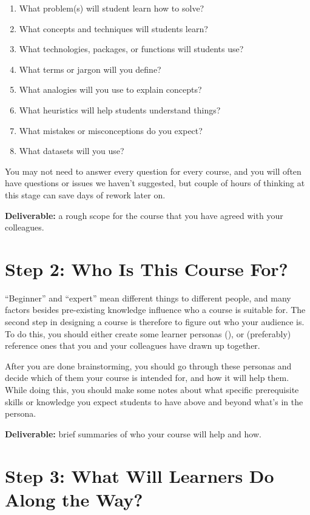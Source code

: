 \begin{enumerate}
\item
  What problem(s) will student learn how to solve?
\item
  What concepts and techniques will students learn?
\item
  What technologies, packages, or functions will students use?
\item
  What terms or jargon will you define?
\item
  What analogies will you use to explain concepts?
\item
  What heuristics will help students understand things?
\item
  What mistakes or misconceptions do you expect?
\item
  What datasets will you use?
\end{enumerate}

You may not need to answer every question for every course, and you will
often have questions or issues we haven't suggested, but couple of hours
of thinking at this stage can save days of rework later on.

\textbf{Deliverable:} a rough scope for the course that you have
agreed with your colleagues.

\section*{Step 2: Who Is This Course For?}

``Beginner'' and ``expert'' mean different things to different people,
and many factors besides pre-existing knowledge influence who a course
is suitable for. The second step in designing a course is therefore to
figure out who your audience is. To do this, you should either create
some learner personas (), or (preferably)
reference ones that you and your colleagues have drawn up together.

After you are done brainstorming, you should go through these personas
and decide which of them your course is intended for, and how it will
help them. While doing this, you should make some notes about what
specific prerequisite skills or knowledge you expect students to have
above and beyond what's in the persona.

\textbf{Deliverable:} brief summaries of who your course will help and
how.

\section*{Step 3: What Will Learners Do Along the Way?}

